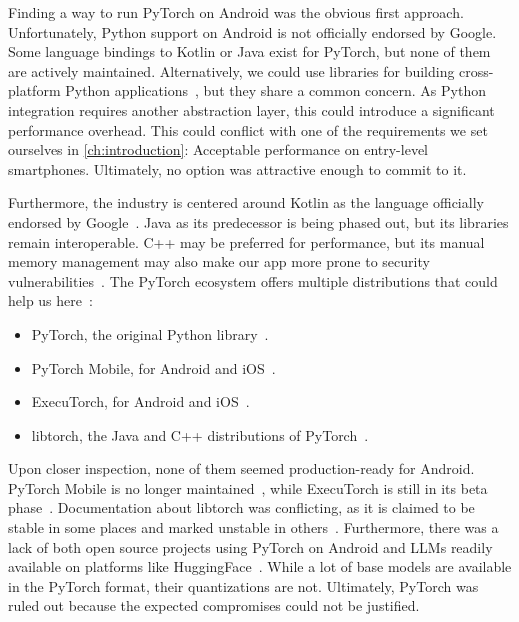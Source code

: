 Finding a way to run PyTorch on Android was the obvious first approach. Unfortunately, Python support on Android is not officially endorsed by Google. Some language bindings to Kotlin or Java exist for PyTorch, but none of them are actively maintained. Alternatively, we could use libraries for building cross-platform Python applications~\cite{kivyKivyKivy2025,beewareBeewareToga2025,chaquoChaquoChaquopy2025}, but they share a common concern. As Python integration requires another abstraction layer, this could introduce a significant performance overhead. This could conflict with one of the requirements we set ourselves in \cref{ch:introduction}: Acceptable performance on entry-level smartphones. Ultimately, no option was attractive enough to commit to it.

Furthermore, the industry is centered around Kotlin as the language officially endorsed by Google~\cite{ruggiaDarkSideNative2025}. Java as its predecessor is being phased out, but its libraries remain interoperable. C++ may be preferred for performance, but its manual memory management may also make our app more prone to security vulnerabilities~\cite{ruggiaDarkSideNative2025}. The PyTorch ecosystem offers multiple distributions that could help us here~\cite{pytorchPyTorch}:
\begin{itemize}
	\item PyTorch, the original Python library~\cite{anselPyTorch2Faster2024}.
	\item PyTorch Mobile, for Android and iOS~\cite{pytorchPytorchAndroiddemoapp2025}.
	\item ExecuTorch, for Android and iOS~\cite{pytorchPytorchExecutorch2025}.
	\item libtorch, the Java and C++ distributions of PyTorch~\cite{pytorchStartLocally,pytorchPyTorchAPIPyTorch}.
\end{itemize}

Upon closer inspection, none of them seemed production-ready for Android. PyTorch Mobile is no longer maintained~\cite{pytorchPytorchAndroiddemoapp2025}, while ExecuTorch is still in its beta phase~\cite{pytorchPytorchExecutorch2025}. Documentation about libtorch was conflicting, as it is claimed to be stable in some places and marked unstable in others~\cite{pytorchStartLocally,pytorchPyTorchAPIPyTorch}. Furthermore, there was a lack of both open source projects using PyTorch on Android and \glspl{LLM} readily available on platforms like HuggingFace~\cite{huggingfaceModelsHuggingFace2025}. While a lot of base models are available in the PyTorch format, their quantizations are not. Ultimately, PyTorch was ruled out because the expected compromises could not be justified.

